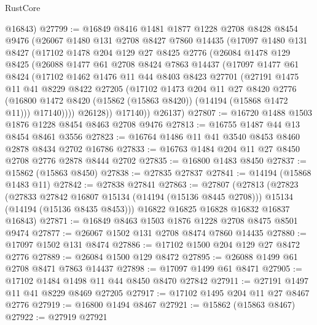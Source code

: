 \begin{lexlean}{RustCore}
\begin{coremodule}
      @16843)
@27799 := @16849
    @8416
    @1481
    @1877
    @1228
    @2708
    @8428
    @8454
    @9476
    (@26067
      @1480
      @131
      @2708
      @8427
      @7860
      @14435
      (@17097
        @1480
        @131
        @8427
        (@17102
          @1478
          @204
          @129
          @27
          @8425
          @2776
          (@26084
            @1478
            @129
            @8425
            (@26088
              @1477
              @61
              @2708
              @8424
              @7863
              @14437
              (@17097
                @1477
                @61
                @8424
                (@17102
                  @1462
                  @1476
                  @11
                  @44
                  @8403
                  @8423
                  @27701
                  (@27191
                    @1475
                    @11
                    @41
                    @8229
                    @8422
                    @27205
                    (@17102
                      @1473
                      @204
                      @11
                      @27
                      @8420
                      @2776
                      (@16800 @1472 @8420 (@15862 (@15863 @8420)) (@14194 (@15868 @1472 @11)))
                      @17140))))
              @26128))
          @17140))
      @26137)
@27807 := @16720 @1488 @1503 @1876 @1228 @8454 @8463 @2708 @9476
@27813 := @16755 @1487 @44 @13 @8454 @8461 @3556
@27823 := @16764 @1486 @11 @41 @3540 @8453 @8460 @2878 @8434 @2702 @16786
@27833 := @16763 @1484 @204 @11 @27 @8450 @2708 @2776 @2878 @8444 @2702
@27835 := @16800 @1483 @8450
@27837 := @15862 (@15863 @8450)
@27838 := @27835 @27837
@27841 := @14194 (@15868 @1483 @11)
@27842 := @27838 @27841
@27863 := @27807
    (@27813
      (@27823
        (@27833 @27842 @16807 @15134 (@14194 (@15136 @8445 @2708)))
        @15134
        (@14194 (@15136 @8435 @8453)))
      @16822
      @16825
      @16828
      @16832
      @16837
      @16843)
@27871 := @16849 @8463 @1503 @1876 @1228 @2708 @8475 @8501 @9474
@27877 := @26067 @1502 @131 @2708 @8474 @7860 @14435
@27880 := @17097 @1502 @131 @8474
@27886 := @17102 @1500 @204 @129 @27 @8472 @2776
@27889 := @26084 @1500 @129 @8472
@27895 := @26088 @1499 @61 @2708 @8471 @7863 @14437
@27898 := @17097 @1499 @61 @8471
@27905 := @17102 @1484 @1498 @11 @44 @8450 @8470 @27842
@27911 := @27191 @1497 @11 @41 @8229 @8469 @27205
@27917 := @17102 @1495 @204 @11 @27 @8467 @2776
@27919 := @16800 @1494 @8467
@27921 := @15862 (@15863 @8467)
@27922 := @27919 @27921

\end{coremodule}
\end{lexlean}
